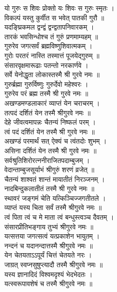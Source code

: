 यो गुरुः स शिवः प्रोक्तो यः शिवः स गुरुः स्मृतः ।\\[-2mm]
विकल्पं यस्तु कुर्वीत स भवेत् पातकी गुरौ ॥\\
यदङ्घ्रिकमल द्वन्द्वं द्वन्द्वतापनिवारकम् ।\\[-2mm]
तारकं भवसिन्धोश्च तं गुरुं प्रणमाम्यहम् ॥\\
गुरुरेव जगत्सर्वं ब्रह्मविष्णुशिवात्मकम् ।\\[-2mm]
गुरोः परतरं नास्ति तस्मात्तं पूजयेद्गुरुम् ॥\\
संसारवृक्षमारूढाः पतन्तो नरकार्णवे ।\\[-2mm]
सर्वे येनोद्धृता लोकास्तस्मै श्री गुरवे नमः ॥\\
गुरुर्ब्रह्मा गुरुर्विष्णुः गुरुर्देवो महेश्वरः ।\\[-2mm]
गुरुरेव परं ब्रह्म तस्मै श्री गुरवे नमः ॥\\
अखण्डमण्डलाकारं व्याप्तं येन चराचरम् ।\\[-2mm]
तत्पदं दर्शितं येन तस्मै श्रीगुरवे नमः ॥\\
देहे जीवत्वमापन्नः चैतन्यं निष्फलं परम् ।\\[-2mm]
त्वं पदं दर्शितं येन तस्मै श्री गुरवे नमः ॥\\
अखण्डं परमार्थं सत् ऐक्यं च त्वंतदोः शुभम् ।\\[-2mm]
असिना दर्शितं येन तस्मै श्री गुरवे नमः ॥\\
सर्वश्रुतिशिरोरत्ननीराजितपदाम्बुजम् ।\\[-2mm]
वेदान्ताम्बुजसूर्याभं श्रीगुरुं शरणं व्रजेत् ॥\\
चैतन्यं शाश्वतं शान्तं मायातीतं निरञ्जनम् ।\\[-2mm]
नादबिन्दुकलातीतं तस्मै श्री गुरवे नमः ॥\\
स्थावरं जङ्गमं चेति यत्किञ्चिज्जगतीतले ।\\[-2mm]
व्याप्तं यस्य चिता सर्वं तस्मै श्रीगुरवे नमः ॥\\
त्वं पिता त्वं च मे माता त्वं बन्धुस्त्वञ्च दैवतम् ।\\[-2mm]
संसारप्रीतिभङ्गाय तुभ्यं श्रीगुरवे नमः ॥\\
यत्सत्तया जगत्सत्वं यत्प्रकाशेन भायुतम् ।\\[-2mm]
नन्दनं च यदानन्दात्तस्मै श्रीगुरवे नमः ॥\\
येन चेतयताऽऽपूर्यं चित्तं चेतयते नरः ।\\[-2mm]
जाग्रत् स्वप्नसुषुप्त्यादौ तस्मै श्रीगुरवे नमः ॥\\
यस्य ज्ञानादिदं विश्वमदृश्यं भेदभेदतः ।\\[-2mm]
यत्स्वरूपावशेषं च तस्मै श्रीगुरवे नमः ॥\\
